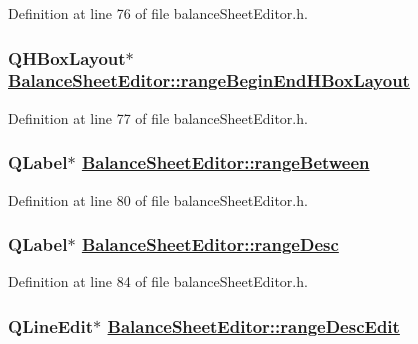 Definition at line 76 of file balance\-Sheet\-Editor.h.\hypertarget{classBalanceSheetEditor_r20}{
\subsubsection[rangeBeginEndHBoxLayout]{\setlength{\rightskip}{0pt plus 5cm}QHBox\-Layout$\ast$ \hyperlink{classBalanceSheetEditor_r20}{Balance\-Sheet\-Editor::range\-Begin\-End\-HBox\-Layout}}}
\label{classBalanceSheetEditor_r20}


Definition at line 77 of file balance\-Sheet\-Editor.h.\hypertarget{classBalanceSheetEditor_r23}{
\subsubsection[rangeBetween]{\setlength{\rightskip}{0pt plus 5cm}QLabel$\ast$ \hyperlink{classBalanceSheetEditor_r23}{Balance\-Sheet\-Editor::range\-Between}}}
\label{classBalanceSheetEditor_r23}


Definition at line 80 of file balance\-Sheet\-Editor.h.\hypertarget{classBalanceSheetEditor_r27}{
\subsubsection[rangeDesc]{\setlength{\rightskip}{0pt plus 5cm}QLabel$\ast$ \hyperlink{classBalanceSheetEditor_r27}{Balance\-Sheet\-Editor::range\-Desc}}}
\label{classBalanceSheetEditor_r27}


Definition at line 84 of file balance\-Sheet\-Editor.h.\hypertarget{classBalanceSheetEditor_r28}{
\subsubsection[rangeDescEdit]{\setlength{\rightskip}{0pt plus 5cm}QLine\-Edit$\ast$ \hyperlink{classBalanceSheetEditor_r28}{Balance\-Sheet\-Editor::range\-Desc\-Edit}}}
\label{classBalanceSheetEditor_r28}


